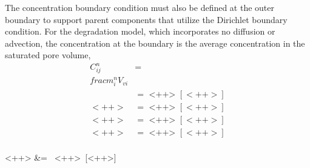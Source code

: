 The concentration boundary condition must also be defined at the outer boundary 
to support parent components that utilize the Dirichlet boundary condition. For 
the degradation model, which incorporates no diffusion or advection, the 
concentration at the boundary is the average concentration in the saturated pore 
volume,
\begin{align}
C_{ij}^n &= \\frac{m_i^n}{V_{vi}}\\
 &= \mbox{ <++> }[<++>] \nonumber\\
<++> &= \mbox{ <++> }[<++>] \nonumber\\
<++> &= \mbox{ <++> }[<++>] \nonumber\\
<++> &= \mbox{ <++> }[<++>] \nonumber\\
\label{<++>}
\end{align}




<++> &= \mbox{ <++> }[<++>] \nonumber\\
